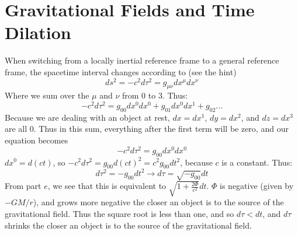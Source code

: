 \documentclass[12pt]{article}
\theoremstyle{definition}
\theoremstyle{remark}
\begin{document}
\section{Gravitational Fields and Time Dilation}

When switching from a locally inertial reference frame to a general reference frame, the spacetime interval changes according to (see the hint)
\begin{equation}
ds^2=-c^2d\tau^2=g_{\mu\nu}dx^{\mu}dx^{\nu}
\end{equation}
Where we sum over the $\mu$ and $\nu$ from $0$ to $3$. Thus:
\begin{equation}
-c^2d\tau^2=g_{00}dx^0dx^0+g_{01}dx^0dx^1+g_{02}...
\end{equation}
Because we are dealing with an object at rest, $dx=dx^1$, $dy=dx^2$, and $dz=dx^3$ are all $0$. Thus in this sum, everything after the first term will be zero, and our equation becomes
\begin{equation}
-c^2d\tau^2=g_{00}dx^0dx^0
\end{equation}
$dx^0=d(ct)$, so $-c^2d\tau^2=g_{00}d(ct)^2=c^2g_{00}dt^2$, because $c$ is a constant. Thus:
\begin{equation}
d\tau^2=-g_{00}dt^2\rightarrow d\tau=\sqrt{-g_{00}}dt
\end{equation}
From part $e$, we see that this is equivalent to $\sqrt{1+\frac{2\Phi}{c^2}}dt$. $\Phi$ is negative (given by $-GM/r$), and grows more negative the closer an object is to the source of the gravitational field. Thus the square root is less than one, and so $d\tau<dt$, and $d\tau$ shrinks the closer an object is to the source of the gravitational field.
\end{document}
